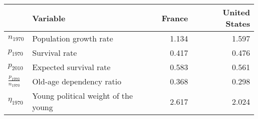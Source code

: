 
\begin{tabular}{llrr}
\toprule
\textbf{} & \textbf{Variable} & \textbf{France} & \textbf{United States}\\
\midrule
$n_{1970}$ & Population growth rate & 1.134 & 1.597\\
$p_{1970}$ & Survival rate & 0.417 & 0.476\\
$p_{2010}$ & Expected survival rate & 0.583 & 0.561\\
$\frac{p_{1970}}{n_{1970}}$ & Old-age dependency ratio & 0.368 & 0.298\\
$\eta_{1970}$ & Young political weight of the young & 2.617 & 2.024\\
\bottomrule
\end{tabular}
